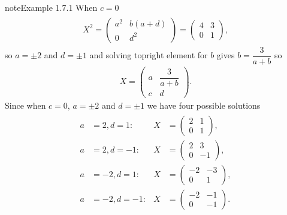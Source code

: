 \documentclass[letterpaper,10pt,english]{jupyterBook}
\begin{document}
\begin{sphinxadmonition}{note}{Example 1.7.1}
\sphinxAtStartPar
When \(c = 0\)
\begin{equation*}
\begin{split} \begin{align*}
    X^2 = \begin{pmatrix} a^2 & b(a + d) \\ 0 & d^2 \end{pmatrix}
    =
    \begin{pmatrix} 4 & 3 \\ 0 & 1 \end{pmatrix},
\end{align*} \end{split}
\end{equation*}
\sphinxAtStartPar
so \(a = \pm 2\) and \(d = \pm 1\) and solving top\sphinxhyphen{}right element for \(b\) gives \(b = \dfrac{3}{a + b}\) so
\begin{equation*}
\begin{split}X = \begin{pmatrix} a & \dfrac{3}{a + b} \\ c & d \end{pmatrix}.\end{split}
\end{equation*}
\sphinxAtStartPar
Since when \(c=0\), \(a = \pm 2\) and \(d = \pm 1\) we have four possible solutions
\begin{equation*}
\begin{split} \begin{align*}
    a &= 2, d = 1: &
    X &= 
    \begin{pmatrix} 2 & 1 \\ 0 & 1 \end{pmatrix}, \\
    a &= 2, d = -1: &
    X &=
    \begin{pmatrix} 2 & 3 \\ 0 & -1 \end{pmatrix}, \\
    a &= -2, d = 1: &
    X &=
    \begin{pmatrix} -2 & -3 \\ 0 & 1 \end{pmatrix}, \\
    a &= -2, d = -1: &
    X &=
    \begin{pmatrix} -2 & -1 \\ 0 &  -1 \end{pmatrix}.
\end{align*} \end{split}
\end{equation*}\begin{equation*}

\end{equation*}
\end{sphinxadmonition}
\end{document}
